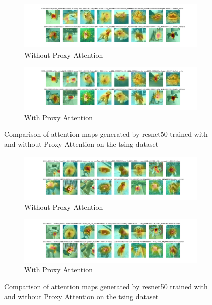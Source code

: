 
    \begin{figure}[H]
        \centering
        \begin{subfigure}[b]{1\textwidth}
            \includegraphics[width=\textwidth]{images/gpp_tsing_resnet50_noproxy_0.pdf}
            \caption{Without Proxy Attention}
        \end{subfigure}
        \hfill
        \begin{subfigure}[b]{1\textwidth}
            \includegraphics[width=\textwidth]{images/gpp_tsing_resnet50_proxy_0.pdf}
            \caption{With Proxy Attention}
        \end{subfigure}
        \caption{Comparison of attention maps generated by resnet50 trained with and without Proxy Attention on the tsing dataset}
    \end{figure}
    

    \begin{figure}[H]
        \centering
        \begin{subfigure}[b]{1\textwidth}
            \includegraphics[width=\textwidth]{images/gpp_tsing_resnet50_noproxy_1.pdf}
            \caption{Without Proxy Attention}
        \end{subfigure}
        \hfill
        \begin{subfigure}[b]{1\textwidth}
            \includegraphics[width=\textwidth]{images/gpp_tsing_resnet50_proxy_1.pdf}
            \caption{With Proxy Attention}
        \end{subfigure}
        \caption{Comparison of attention maps generated by resnet50 trained with and without Proxy Attention on the tsing dataset}
    \end{figure}
    

